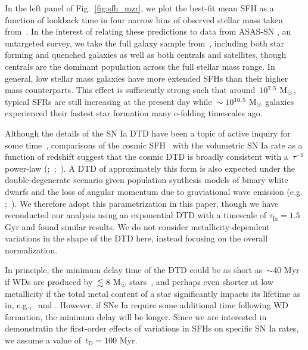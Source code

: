 \documentclass[ms.tex]{subfiles}
\begin{document}
In the left panel of Fig.~\ref{fig:sfh_mzr}, we plot the best-fit mean SFH as a
function of lookback time in four narrow bins of observed stellar mass taken
from~\um.
In the interest of relating these predictions to data from ASAS-SN
\citep{Shappee2014, Kochanek2017}, an untargeted survey, we take the full
galaxy sample from~\um, including both star forming and quenched galaxies as
well as both centrals and satellites, though centrals are the dominant
population across the full stellar mass range.
In general, low stellar mass galaxies have more extended SFHs than their
higher mass counterparts.
This effect is sufficiently strong such that around~$10^{7.5}~\text{M}_\odot$, typical
SFRs are still increasing at the present day while~$\sim10^{10.5}~\text{M}_\odot$
galaxies experienced their fastest star formation many e-folding timescales ago.
\par
Although the details of the SN Ia DTD have been a topic of active inquiry for
some time~\citep[e.g.][]{Greggio2005, Strolger2020, Freundlich2021},
comparisons of the cosmic SFH~\citep[e.g.][]{Hopkins2006, Davies2016, Madau2014,
Madau2017, Driver2018} with the volumetric SN Ia rate as a function of redshift
suggest that the cosmic DTD is broadly consistent with a~$\tau^{-1}$ power-law
(\citealp{Maoz2012a};~\citealp*{Maoz2012b};~\citealp{Graur2013, Graur2014}).
A DTD of approximately this form is also expected under the double-degenerate
scenario given population synthesis models of binary white dwarfs and the loss
of angular momentum due to graviational wave emission (e.g.
\citealp{Mennekens2010};~\citealp*{Maoz2014}).
We therefore adopt this parametrization in this paper, though we have
reconducted our analysis using an exponential DTD with a timescale of
$\tau_\text{Ia} = 1.5$ Gyr and found similar results.
We do not consider metallicity-dependent variations in the shape of the DTD
here, instead focusing on the overall normalization.
\par
In principle, the minimum delay time of the DTD could be as short as~$\sim$40
Myr if WDs are produced by~$\lesssim 8~\text{M}_\odot$ stars~\citep*[e.g.][]{Hurley2000},
and perhaps even shorter at low metallicity if the total metal content of a
star significantly impacts its lifetime as in, e.g.,~\citet{Kodama1997} and
\citet{Vincenzo2016}.
However, if SNe Ia require some additional time following WD formation, the
minimum delay will be longer.
Since we are interested in demonstratin the first-order effects of variations
in SFHs on specific SN Ia rates, we assume a value of~$t_\text{D} = 100$ Myr.
\end{document}
